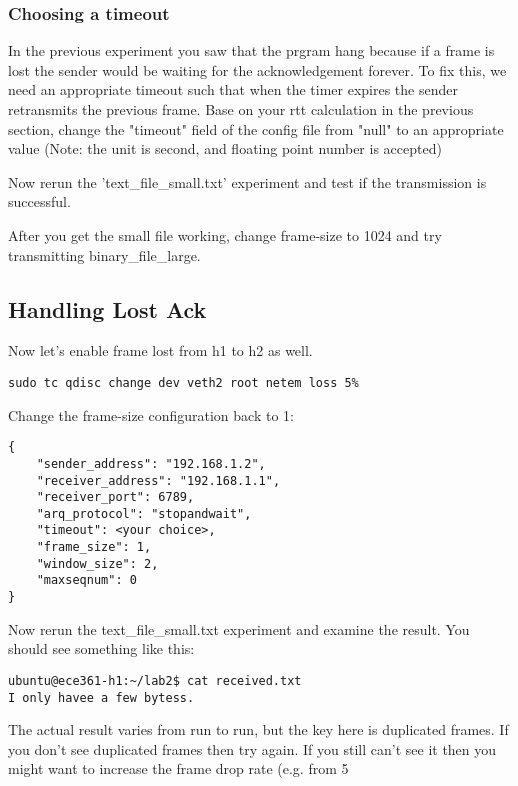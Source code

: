 \documentclass[11pt]{article}
\begin{document}
\subsubsection {Choosing a timeout}
In the previous experiment you saw that the prgram hang because if a frame is lost the sender would be waiting for the acknowledgement forever. To fix this, we need an appropriate timeout such that when the timer expires the sender retransmits the previous frame. Base on your rtt calculation in the previous section, change the "timeout" field of the config file from "null" to an appropriate value (Note: the unit is second, and floating point number is accepted)


\noindent Now rerun the 'text\_file\_small.txt' experiment and test if the transmission is successful.

\noindent After you get the small file working, change frame-size to 1024 and try transmitting binary\_file\_large.


\subsection {Handling Lost Ack}
Now let's enable frame lost from h1 to h2 as well.
\begin{lstlisting}[style=ece361shell, caption={}]
sudo tc qdisc change dev veth2 root netem loss 5%
\end{lstlisting}

Change the frame-size configuration back to 1:
\begin{lstlisting}[caption={Configuration For Large File}]
{
    "sender_address": "192.168.1.2",
    "receiver_address": "192.168.1.1",
    "receiver_port": 6789,
    "arq_protocol": "stopandwait",
    "timeout": <your choice>,
    "frame_size": 1,
    "window_size": 2,
    "maxseqnum": 0
}
\end{lstlisting}
Now rerun the text\_file\_small.txt experiment and examine the result. You should see something like this:

\begin{lstlisting}[style=ece361shell, caption={}]
ubuntu@ece361-h1:~/lab2$ cat received.txt
I only havee a few bytess.
\end{lstlisting}
The actual result varies from run to run, but the key here is duplicated frames. If you don't see duplicated frames then try again. If you still can't see it then you might want to increase the frame drop rate (e.g. from 5%
\end{document}
